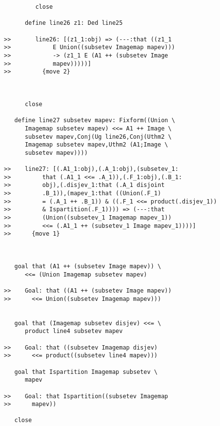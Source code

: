 \documentclass[12pt]{article}
\begin{document}
\begin{verbatim}
         close

      define line26 z1: Ded line25

>>       line26: [(z1_1:obj) => (---:that ((z1_1
>>            E Union((subsetev Imagemap mapev)))
>>            -> (z1_1 E (A1 ++ (subsetev Image
>>            mapev)))))]
>>         {move 2}



      close

   define line27 subsetev mapev: Fixform((Union \
      Imagemap subsetev mapev) <<= A1 ++ Image \
      subsetev mapev,Conj(Ug line26,Conj(Uthm2 \
      Imagemap subsetev mapev,Uthm2 (A1;Image \
      subsetev mapev))))

>>    line27: [(.A1_1:obj),(.A_1:obj),(subsetev_1:
>>         that (.A1_1 <<= .A_1)),(.F_1:obj),(.B_1:
>>         obj),(.disjev_1:that (.A_1 disjoint
>>         .B_1)),(mapev_1:that ((Union(.F_1)
>>         = (.A_1 ++ .B_1)) & ((.F_1 <<= product(.disjev_1))
>>         & Ispartition(.F_1)))) => (---:that
>>         (Union((subsetev_1 Imagemap mapev_1))
>>         <<= (.A1_1 ++ (subsetev_1 Image mapev_1))))]
>>      {move 1}



   goal that (A1 ++ (subsetev Image mapev)) \
      <<= (Union Imagemap subsetev mapev)

>>    Goal: that ((A1 ++ (subsetev Image mapev))
>>      <<= Union((subsetev Imagemap mapev)))


   goal that (Imagemap subsetev disjev) <<= \
      product line4 subsetev mapev

>>    Goal: that ((subsetev Imagemap disjev)
>>      <<= product((subsetev line4 mapev)))

   goal that Ispartition Imagemap subsetev \
      mapev

>>    Goal: that Ispartition((subsetev Imagemap
>>      mapev))

   close
\end{verbatim}
\end{document}
